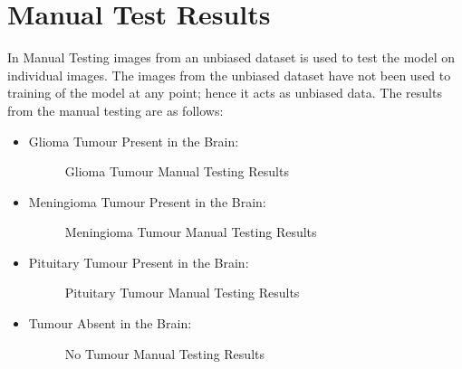 \section{Manual Test Results}
In Manual Testing images from an unbiased dataset is used to test the model on individual images. The images from the unbiased dataset have not been used to training of the model at any point; hence it acts as unbiased data. The results from the manual testing are as follows:
\begin{itemize}
    \item Glioma Tumour Present in the Brain:
        \begin{figure}[H]
        \caption{Glioma Tumour Manual Testing Results} \label{fig:glioma_res}
        \end{figure}
    \item Meningioma Tumour Present in the Brain:
        \begin{figure}[H]
        \caption{Meningioma Tumour Manual Testing Results} \label{fig:menin_res}
        \end{figure}
    \item Pituitary Tumour Present in the Brain:  
        \begin{figure}[H]
        \caption{Pituitary Tumour Manual Testing Results} \label{fig:pitu_res}
        \end{figure}
    \item Tumour Absent in the Brain:  
        \begin{figure}[H]
        \caption{No Tumour Manual Testing Results} \label{fig:no_tumour_res}
        \end{figure}   
\end{itemize}

